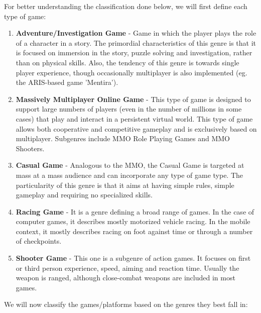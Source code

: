 For better understanding the classification done below, we will first define
each type of game:

\begin{enumerate}
  \item \textbf{Adventure/Investigation Game} - Game in which the player plays
  the role of a character in a story. The primordial characteristics of this
  genre is that it is focused on immersion in the story, puzzle solving and
  investigation, rather than on physical skills. Also, the tendency of this
  genre is towards single player experience, though occasionally multiplayer is
  also implemented (eg. the ARIS-based game 'Mentira').
  
  \item \textbf{Massively Multiplayer Online Game} - This type of game is
  designed to support large numbers of players (even in the number of millions
  in some cases) that play and interact in a persistent virtual world. This type
  of game allows both cooperative and competitive gameplay and is exclusively
  based on multiplayer. Subgenres include MMO Role Playing Games and
  MMO Shooters.
  
  \item \textbf{Casual Game} - Analogous to the MMO, the Casual Game is targeted
  at mass at a mass audience and can incorporate any type of game type. The
  particularity of this genre is that it aims at having simple rules, simple
  gameplay and requiring no specialized skills. 
  
  \item \textbf{Racing Game} - It is a genre defining a broad range of games. In
  the case of computer games, it describes mostly motorized vehicle racing. In
  the mobile context, it mostly describes racing on foot against time or through
  a number of checkpoints.
  
  \item \textbf{Shooter Game} - This one is a subgenre of action games. It
  focuses on first or third person experience, speed, aiming and reaction time.
  Usually the weapon is ranged, although close-combat weapons are included in
  most games.
  
\end{enumerate}

We will now classify the games/platforms based on the genres they best fall in:

